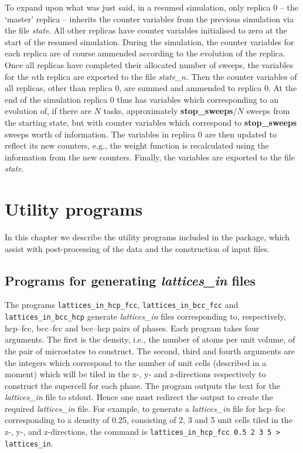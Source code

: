 \documentclass{report}
\begin{document}
To expand upon what was just said, in a resumed simulation, only replica 0 -- the `master' replica -- inherits the counter variables from the previous 
simulation via the file \emph{state}. All other replicas have counter variables initialised to zero at the start of the resumed simulation.
During the simulation, the counter variables for each replica are of course ammended according to the evolution of the replica. Once all replicas have
completed their allocated number of sweeps, the variables for the $n$th replica are exported to the file \emph{state\_}$n$. Then 
the counter variables of all replicas, other than replica 0, are summed and ammended to replica 0. At the end of the simulation replica 0 thus has
variables which corresponding to an evolution of, if there are $N$ tasks, approximately \textbf{stop\_sweeps}$/N$ sweeps from the starting state, 
but with counter variables which correspond to \textbf{stop\_sweeps} sweeps worth of information. The variables in replica 0 are then updated to reflect 
its new counters, e.g., the weight function is recalculated using the information from the new counters. Finally, the variables are
exported to the file \emph{state}. 


\chapter{Utility programs}\label{chapter:utility_programs}
In this chapter we describe the utility programs included in the package, which assist with post-processing of the data and the construction
of input files.

\section{Programs for generating \emph{lattices\_in} files}
The programs \texttt{lattices\_in\_hcp\_fcc}, \texttt{lattices\_in\_bcc\_fcc} and \texttt{lattices\_in\_bcc\_hcp} generate \emph{lattices\_in} 
files corresponding to, respectively, hcp--fcc, bcc--fcc and bcc--hcp pairs of phases.
Each program takes four arguments. The first is the density, i.e., the number of atoms per unit volume, of the pair of microstates to
construct. The second, third and fourth arguments are the integers which correspond
to the number of unit cells (described in a moment) which will be tiled in the x-, y- and z-directions respectively to construct the
supercell for each phase. The program outputs the text for the \emph{lattices\_in} file to stdout. Hence one must redirect the output
to create the required \emph{lattices\_in} file.
For example, to generate a \emph{lattices\_in} file for hcp--fcc corresponding to a density of 0.25, consisting
of 2, 3 and 5 unit cells tiled in the z-, y-, and z-directions, the command is \texttt{lattices\_in\_hcp\_fcc 0.5 2 3 5 > lattices\_in}.
\end{document}
